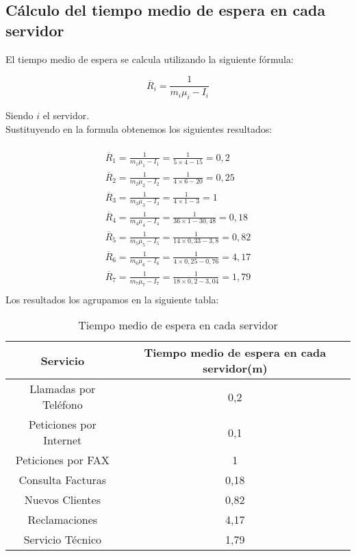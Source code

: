 \subsection{Cálculo del tiempo medio de espera en cada servidor}

El tiempo medio de espera se calcula utilizando la siguiente fórmula:

\begin{equation}
\overline{R}_{i} = \frac{1}{m_{i}\mu_{i}-I_{i}}
\end{equation}

Siendo $i$ el servidor.\\

Sustituyendo en la formula obtenemos los siguientes resultados:

\begin{multline}\\
\overline{R}_{1} = \frac{1}{m_{1}\mu_{1}-I_{1}} = \frac{1}{5\times 4 - 15} = 0,2\\
\overline{R}_{2} = \frac{1}{m_{2}\mu_{2}-I_{2}} = \frac{1}{4\times 6 - 20} = 0,25\\
\overline{R}_{3} = \frac{1}{m_{3}\mu_{3}-I_{3}} = \frac{1}{4\times 1 - 3} = 1\\
\overline{R}_{4} = \frac{1}{m_{4}\mu_{4}-I_{4}} = \frac{1}{36\times 1 - 30,48} = 0,18\\
\overline{R}_{5} = \frac{1}{m_{5}\mu_{5}-I_{5}} = \frac{1}{14\times 0,33 - 3,8} = 0,82\\
\overline{R}_{6} = \frac{1}{m_{6}\mu_{6}-I_{6}} = \frac{1}{4\times 0,25 - 0,76} = 4,17\\
\overline{R}_{7} = \frac{1}{m_{7}\mu_{7}-I_{7}} = \frac{1}{18\times 0,2 - 3,04} = 1,79\\
\end{multline}
Los resultados los agrupamos en la siguiente tabla:

\begin{table}[H]
  \begin{center}
  \begin{tabular}{|c|c|}
    \hline
    \textbf{Servicio}       & \textbf{Tiempo medio de espera en cada servidor(m)} \\ \hline
    Llamadas por Teléfono   & 0,2                   \\ \hline
    Peticiones por Internet & 0,1                  \\ \hline
    Peticiones por FAX      & 1                   \\ \hline
    Consulta Facturas      & 0,18                   \\ \hline
    Nuevos Clientes      & 0,82                   \\ \hline
    Reclamaciones      & 4,17                   \\ \hline
    Servicio Técnico      & 1,79                   \\ \hline
  \end{tabular}
\end{center}
  \caption{Tiempo medio de espera en cada servidor}
  \end{table}
  
